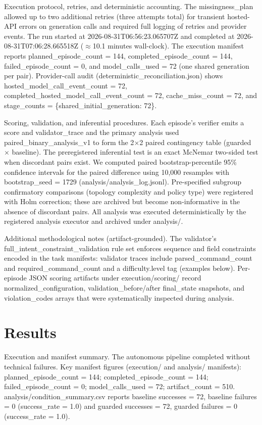 \documentclass[conference]{IEEEtran}
\begin{document}
Execution protocol, retries, and deterministic accounting. The missingness\_plan allowed up to two additional retries (three attempts total) for transient hosted-API errors on generation calls and required full logging of retries and provider events. The run started at 2026-08-31T06:56:23.065707Z and completed at 2026-08-31T07:06:28.665518Z (\ensuremath{\approx}10.1 minutes wall-clock). The execution manifest reports planned\_episode\_count = 144, completed\_episode\_count = 144, failed\_episode\_count = 0, and model\_calls\_used = 72 (one shared generation per pair). Provider-call audit (deterministic\_reconciliation.json) shows hosted\_model\_call\_event\_count = 72, completed\_hosted\_model\_call\_event\_count = 72, cache\_miss\_count = 72, and stage\_counts = \{shared\_initial\_generation: 72\}.

Scoring, validation, and inferential procedures. Each episode's verifier emits a score and validator\_trace and the primary analysis used paired\_binary\_analysis\_v1 to form the 2\ensuremath{\times}2 paired contingency table (guarded \ensuremath{\times} baseline). The preregistered inferential test is an exact McNemar two-sided test when discordant pairs exist. We computed paired bootstrap-percentile 95\% confidence intervals for the paired difference using 10,000 resamples with bootstrap\_seed = 1729 (analysis/analysis\_log.jsonl). Pre-specified subgroup confirmatory comparisons (topology complexity and policy type) were registered with Holm correction; these are archived but become non-informative in the absence of discordant pairs. All analysis was executed deterministically by the registered analysis executor and archived under analysis/.

Additional methodological notes (artifact-grounded). The validator's full\_intent\_constraint\_validation rule set enforces sequence and field constraints encoded in the task manifests: validator traces include parsed\_command\_count and required\_command\_count and a difficulty.level tag (examples below). Per-episode JSON scoring artifacts under execution/scoring/ record normalized\_configuration, validation\_before/after final\_state snapshots, and violation\_codes arrays that were systematically inspected during analysis.

\section{Results}
Execution and manifest summary. The autonomous pipeline completed without technical failures. Key manifest figures (execution/ and analysis/ manifests): planned\_episode\_count = 144; completed\_episode\_count = 144; failed\_episode\_count = 0; model\_calls\_used = 72; artifact\_count = 510. analysis/condition\_summary.csv reports baseline successes = 72, baseline failures = 0 (success\_rate = 1.0) and guarded successes = 72, guarded failures = 0 (success\_rate = 1.0).
\end{document}
